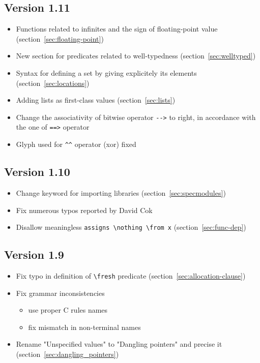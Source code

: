 \subsection{Version 1.11}
\begin{itemize}
\item Functions related to infinites and the sign of floating-point value
  (section~\ref{sec:floating-point})
\item New section for predicates related to well-typedness
  (section~\ref{sec:welltyped})
\item Syntax for defining a set by giving explicitely its elements
  (section~\ref{sec:locations})
\item Adding lists as first-class values (section~\ref{sec:lists})
\item Change the associativity of bitwise operator \lstinline|-->| to right,
  in accordance with the one of \lstinline|==>| operator
\item Glyph used for \lstinline|^^| operator (xor) fixed
\end{itemize}

\subsection{Version 1.10}
\begin{itemize}
\item Change keyword for importing libraries (section~\ref{sec:specmodules})
\item Fix numerous typos reported by David Cok
\item Disallow meaningless \lstinline|assigns \nothing \from x|
  (section~\ref{sec:func-dep})
\end{itemize}

\subsection{Version 1.9}
\begin{itemize}
\item Fix typo in definition of \lstinline|\fresh| predicate
  (section~\ref{sec:allocation-clause})
\item Fix grammar inconsistencies
  \begin{itemize}
  \item use proper C rules names
  \item fix mismatch in non-terminal names
  \end{itemize}
\item Rename "Unspecified values" to "Dangling pointers" and precise it
  (section~\ref{sec:dangling_pointers})
\end{itemize}

